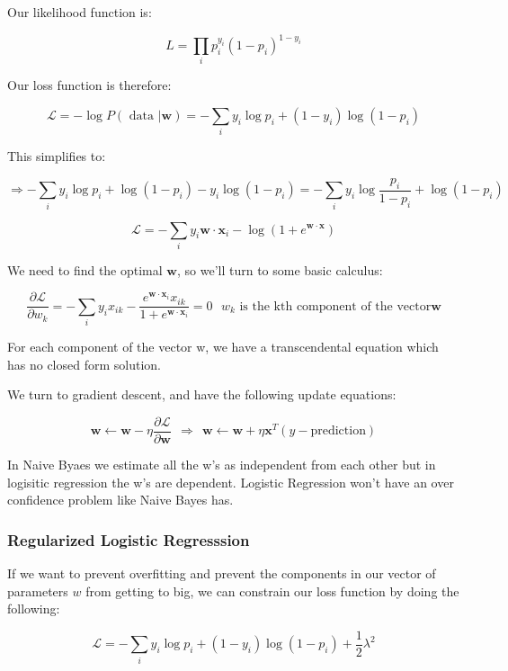 Our likelihood function is:  

$$
L = \prod_i p_i^{y_i} (1 - p_i)^{ 1- y_i}
$$

Our loss function is therefore: 

\begin{equation}
\mathcal{L} = - \log P(\text{ data } | \mathbf{w}) = - \sum_i y_i \log p_i + (1 - y_i) \log( 1 - p_i)
\end{equation}

This simplifies to:

$$
\Rightarrow  - \sum_i y_i \log p_i + \log ( 1 - p_i ) - y_i \log(1 - p_i) = - \sum_i y_i \log \frac{p_i}{ 1 - p_i} + \log ( 1 - p_i) 
$$

$$
\mathcal{L}  = - \sum_i y_i \mathbf{w} \cdot \mathbf{x}_i - \log ( 1 + e^{\mathbf{w} \cdot \mathbf{x}})
$$

We need to find the optimal $\mathbf{w}$, so we'll turn to some basic calculus: 

$$
\frac{ \partial \mathcal{L}}{\partial w_k} = - \sum_i y_i x_{ik} - \frac{e^{\mathbf{w} \cdot \mathbf{x}_i } x_{ik}}{1 + e^{\mathbf{w} \cdot \mathbf{x}_i }}  = 0
~~~ w_k \text{ is the kth component of the vector} \mathbf{w}
$$

For each component of the vector w, we have a transcendental equation which has no closed form solution.  

We turn to gradient descent, and have the following update equations: 

$$
\mathbf{w} \leftarrow \mathbf{w} - \eta \frac{ \partial \mathcal{L}}{\partial \mathbf{w}}  ~~ \Rightarrow ~~ 
\mathbf{w} \leftarrow \mathbf{w} + \eta \mathbf{x}^T( y - \text{prediction})
$$

In Naive Byaes we estimate all the w's as independent from each other but in logisitic regression the w's are dependent.  
Logistic Regression won't have an over confidence problem like Naive Bayes has.  

\pagebreak
\subsubsection{Regularized Logistic Regresssion}

If we want to prevent overfitting and prevent the components in our vector of parameters $w$ from getting to big, we can constrain our loss function by doing the following: 

\begin{equation}
\mathcal{L} = - \sum_i y_i \log p_i + (1 - y_i) \log( 1 - p_i) + \frac{1}{2} \lambda^2
\end{equation}

